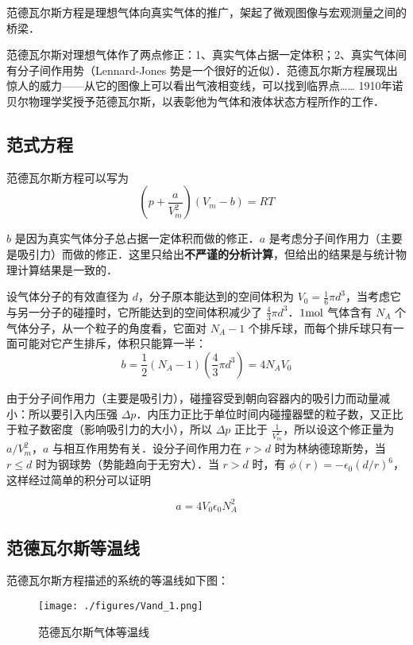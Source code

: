 
\begin{issues}
\issueDraft
\end{issues}

范德瓦尔斯方程是理想气体向真实气体的推广，架起了微观图像与宏观测量之间的桥梁．

范德瓦尔斯对理想气体作了两点修正：1、真实气体占据一定体积；2、真实气体间有分子间作用势（Lennard-Jones 势是一个很好的近似）．范德瓦尔斯方程展现出惊人的威力——从它的图像上可以看出气液相变线，可以找到临界点…… 1910年诺贝尔物理学奖授予范德瓦尔斯，以表彰他为气体和液体状态方程所作的工作．

\subsection{范式方程}
范德瓦尔斯方程可以写为
\begin{equation}
\left(p+\frac{a}{V_m^2}\right)(V_m-b)=RT
\end{equation}

$b$ 是因为真实气体分子总占据一定体积而做的修正．$a$ 是考虑分子间作用力（主要是吸引力）而做的修正．这里只给出\textbf{不严谨的分析计算}，但给出的结果是与统计物理计算结果是一致的．

设气体分子的有效直径为 $d$，分子原本能达到的空间体积为 $V_0=\frac{1}{6}\pi d^3$，当考虑它与另一分子的碰撞时，它所能达到的空间体积减少了 $\frac{4}{3}\pi d^3$．$1\rm mol$ 气体含有 $N_A$ 个气体分子，从一个粒子的角度看，它面对 $N_A-1$ 个排斥球，而每个排斥球只有一面可能对它产生排斥，体积只能算一半：
\begin{equation}
b=\frac{1}{2}(N_A-1)(\frac{4}{3}\pi d^3)=4N_A V_0
\end{equation}

由于分子间作用力（主要是吸引力），碰撞容受到朝向容器内的吸引力而动量减小：所以要引入内压强 $\Delta p$．内压力正比于单位时间内碰撞器壁的粒子数，又正比于粒子数密度（影响吸引力的大小），所以 $\Delta p$ 正比于 $\frac{1}{V_m^2}$，所以设这个修正量为 $a/V_m^2$，$a$ 与相互作用势有关．设分子间作用力在 $r>d$ 时为林纳德琼斯势，当 $r\le d$ 时为钢球势（势能趋向于无穷大）．当 $r>d$ 时，有 $\phi(r)=-\epsilon_0(d/r)^6$，这样经过简单的积分可以证明

\begin{equation}
a=4V_0\epsilon_0 N_A^2
\end{equation}

\subsection{范德瓦尔斯等温线}
范德瓦尔斯方程描述的系统的等温线如下图：
\begin{figure}[ht]
\centering
\texttt{[image: ./figures/Vand\_1.png]}
\caption{范德瓦尔斯气体等温线} \label{Vand_fig1}
\end{figure}

